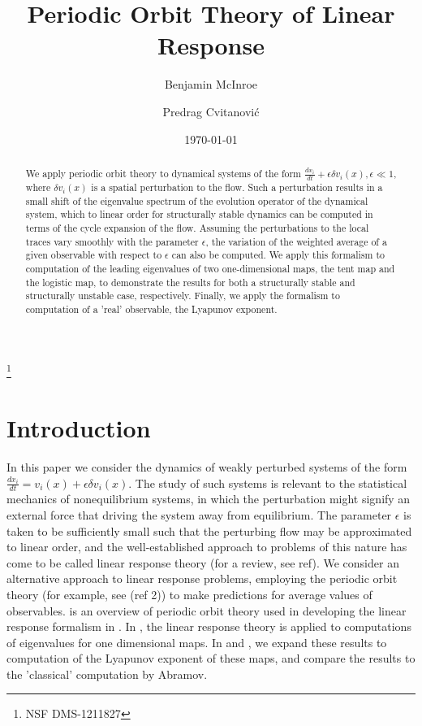 \documentclass[aps,pre,
                showpacs,
                twocolumn,
                groupedaddress,
                floatfix]{revtex4-1}
\begin{document}
\title{Periodic Orbit Theory of Linear Response}
\author{Benjamin McInroe}
\author{Predrag Cvitanovi\'c}
\thanks{NSF DMS-1211827}

\date{\today}

\begin{abstract}
We apply periodic orbit theory to dynamical systems of
the form $\frac{dx_{i}}{dt}+\epsilon \delta v_{i}(x), \epsilon \ll 1$,
where $\delta v_{i}(x)$ is a spatial perturbation to the flow. Such a
perturbation results in a small shift of the eigenvalue spectrum of the
evolution operator of the dynamical system, which to linear order for
structurally stable dynamics can be computed in terms of the cycle
expansion of the flow. Assuming the perturbations to the local traces
vary smoothly with the parameter $\epsilon$, the variation of the
weighted average of a given observable with respect to $\epsilon$ can
also be computed. We apply this formalism to computation of the leading
eigenvalues of two one-dimensional maps, the tent map and the logistic
map, to demonstrate the results for both a structurally stable and
structurally unstable case, respectively. Finally, we apply the formalism
to computation of a 'real' observable, the Lyapunov exponent.
\end{abstract}

\maketitle



\section{Introduction}
\label{sect:intro}

In this paper we consider the dynamics of weakly perturbed systems of
the form $\frac{dx_{i}}{dt}=v_{i}(x) + \epsilon \delta v_{i}(x)$. The
study of such systems is relevant to the statistical mechanics of
nonequilibrium systems, in which the perturbation might signify an
external force that driving the system away from equilibrium. The
parameter $\epsilon$ is taken to be sufficiently small such that the
perturbing flow may be approximated to linear order, and the
well-established approach to problems of this nature has come to be
called linear response theory (for a review, see ref). We consider an
alternative approach to linear response problems, employing the periodic
orbit theory (for example, see (ref 2)) to make predictions for average
values of observables.   is an overview of periodic orbit
theory used in developing the linear response formalism in
. In , the linear response
theory is applied to computations of eigenvalues for one dimensional
maps. In  and , we expand these
results to computation of the Lyapunov exponent of these maps, and compare
the results to the 'classical' computation by Abramov.
\end{document}
